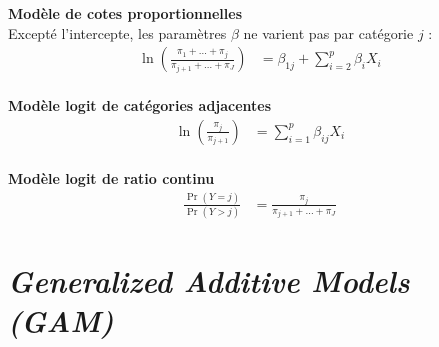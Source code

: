 \documentclass[french]{article}
\begin{document}
\begin{multicols*}{2}
\textbf{Modèle de cotes proportionnelles}	\\
Excepté l'intercepte, les paramètres $\beta$ ne varient pas par catégorie $j$ :
\begin{align*}
	\ln\left(\frac{\pi_{1} + \hdots + \pi_{j}}{\pi_{j + 1} + \hdots + \pi_{J}}\right)
	&=	\beta_{1j} + \sum_{i	=	2}^{p}\beta_{i}X_{i}	\\
\end{align*}

\textbf{Modèle logit de catégories adjacentes}
\begin{align*}
	\ln\left(\frac{\pi_{j}}{\pi_{j + 1}}\right)
	&=	\sum_{i	=	1}^{p}\beta_{ij}X_{i}	\\
\end{align*}

\textbf{Modèle logit de ratio continu}
\begin{align*}
	\frac{\Pr(Y	=	j)}{\Pr(Y	>	j)}
	&=	\frac{\pi_{j}}{\pi_{j + 1} + \hdots + \pi_{J}}
\end{align*}




\newpage
\section{\og \textit{Generalized Additive Models (GAM)} \fg{}}




\newpage

\end{multicols*}
\end{document}
